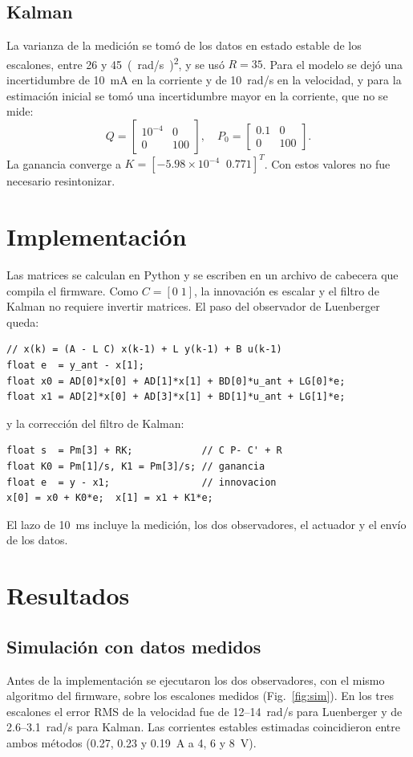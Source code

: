 \documentclass[conference,a4paper]{IEEEtran}
\begin{document}
\subsection{Kalman}
La varianza de la medición se tomó de los datos en estado estable de los escalones, entre 26 y \SI{45}{(rad/s)^2}, y se usó $R=35$. Para el modelo se dejó una incertidumbre de \SI{10}{mA} en la corriente y de \SI{10}{rad/s} en la velocidad, y para la estimación inicial se tomó una incertidumbre mayor en la corriente, que no se mide:
\begin{equation}
Q=\begin{bmatrix}10^{-4} & 0\\ 0 & 100\end{bmatrix},\quad P_0=\begin{bmatrix}0.1 & 0\\ 0 & 100\end{bmatrix}.
\end{equation}
La ganancia converge a $K=[-5.98\times10^{-4}\;\;0.771]^T$. Con estos valores no fue necesario resintonizar.

\section{Implementación}
Las matrices se calculan en Python y se escriben en un archivo de cabecera que compila el firmware. Como $C=[0\;1]$, la innovación es escalar y el filtro de Kalman no requiere invertir matrices. El paso del observador de Luenberger queda:
\begin{lstlisting}
// x(k) = (A - L C) x(k-1) + L y(k-1) + B u(k-1)
float e  = y_ant - x[1];
float x0 = AD[0]*x[0] + AD[1]*x[1] + BD[0]*u_ant + LG[0]*e;
float x1 = AD[2]*x[0] + AD[3]*x[1] + BD[1]*u_ant + LG[1]*e;
\end{lstlisting}
y la corrección del filtro de Kalman:
\begin{lstlisting}
float s  = Pm[3] + RK;            // C P- C' + R
float K0 = Pm[1]/s, K1 = Pm[3]/s; // ganancia
float e  = y - x1;                // innovacion
x[0] = x0 + K0*e;  x[1] = x1 + K1*e;
\end{lstlisting}
El lazo de \SI{10}{ms} incluye la medición, los dos observadores, el actuador y el envío de los datos.

\section{Resultados}
\subsection{Simulación con datos medidos}
Antes de la implementación se ejecutaron los dos observadores, con el mismo algoritmo del firmware, sobre los escalones medidos (Fig.~\ref{fig:sim}). En los tres escalones el error RMS de la velocidad fue de 12--14~rad/s para Luenberger y de 2.6--3.1~rad/s para Kalman. Las corrientes estables estimadas coincidieron entre ambos métodos (0.27, 0.23 y \SI{0.19}{A} a 4, 6 y \SI{8}{V}).
\end{document}
